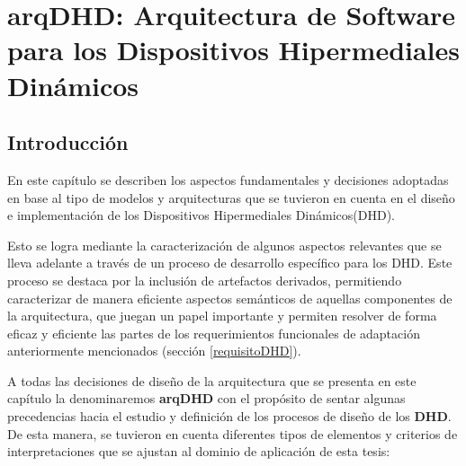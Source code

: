 ﻿%
\chapter{arqDHD: Arquitectura de Software para los Dispositivos
Hipermediales Dinámicos}\label{cap:arqdhd}


\section{Introducción}\label{secc:arqDHD_Introduccion}

En este capítulo se describen los aspectos fundamentales y decisiones adoptadas
en base al tipo de modelos y arquitecturas que se tuvieron en cuenta en el
diseño e implementación de los Dispositivos Hipermediales Dinámicos(DHD).

Esto se logra mediante la caracterización  de algunos aspectos relevantes que se lleva adelante a través de un 
proceso de desarrollo específico para los DHD. Este proceso se destaca por la inclusión
de artefactos derivados, permitiendo caracterizar de manera eficiente aspectos semánticos 
de aquellas componentes de la arquitectura, que juegan un papel importante y permiten
resolver de forma eficaz y eficiente las partes de los requerimientos funcionales de adaptación anteriormente mencionados (sección \ref{requisitoDHD}).

A todas las decisiones de diseño de la arquitectura que se presenta en este capítulo la denominaremos \textbf{arqDHD}  con el propósito de
sentar algunas precedencias hacia el estudio y definición de los procesos de diseño de los \textbf{DHD}. De esta manera, se tuvieron en cuenta diferentes tipos de elementos y criterios de interpretaciones que se ajustan al dominio de aplicación de esta tesis:


